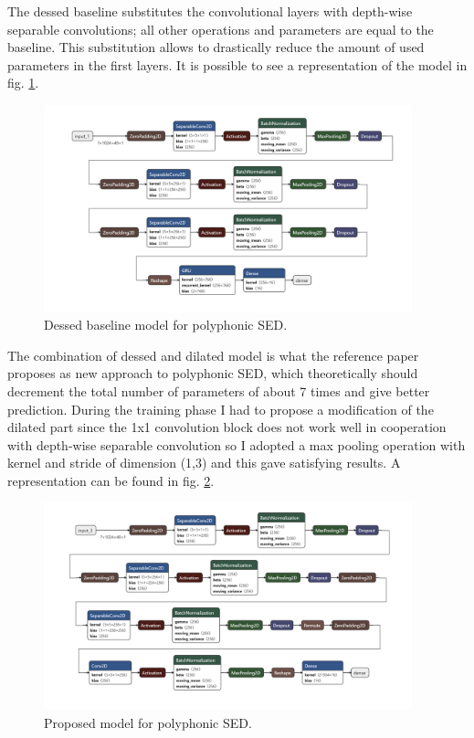 \documentclass{article}
\begin{document}
The dessed baseline substitutes the convolutional layers with depth-wise separable convolutions; all other operations and parameters are equal to the baseline. This substitution allows to drastically reduce the amount of used parameters in the first layers. It is possible to see a representation of the model in fig. \ref{fig:poly_dessed}.

\begin{figure}[H]
	\centering
	\includegraphics[width=0.95\textwidth]{./images/poly/dessed.png}	
	\caption{Dessed baseline model for polyphonic SED.}
	\label{fig:poly_dessed}
\end{figure}

The combination of dessed and dilated model is what the reference paper \cite{drossos2020sound} proposes as new approach to polyphonic SED, which theoretically should decrement the total number of parameters of about 7 times and give better prediction. During the training phase I had to propose a modification of the dilated part since the 1x1 convolution block does not work well in cooperation with depth-wise separable convolution so I adopted a max pooling operation with kernel and stride of dimension (1,3) and this gave satisfying results. A representation can be found in fig. \ref{fig:poly_new_model}.

\begin{figure}[h]
	\centering
	\includegraphics[width=0.95\textwidth]{./images/poly/new model.png}	
	\caption{Proposed model for polyphonic SED.}
	\label{fig:poly_new_model}
\end{figure}
\end{document}
